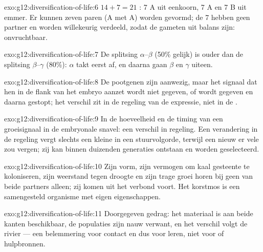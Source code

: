\begin{solution}{exo:g12:diversification-of-life:6}
$14 + 7 = 21$ : 7 A uit eenkoorn, 7 A en 7 B uit emmer. Er
kunnen zeven paren (A met A) worden gevormd; de 7  hebben
geen partner en worden willekeurig verdeeld, zodat de gameten uit balans
zijn: onvruchtbaar.
\end{solution}

\begin{solution}{exo:g12:diversification-of-life:7}
De splitsing $\alpha$--$\beta$ (50\% gelijk) is ouder dan de splitsing
$\beta$--$\gamma$ (80\%): $\alpha$ takt eerst af, en daarna gaan $\beta$
en $\gamma$ uiteen.
\end{solution}

\begin{solution}{exo:g12:diversification-of-life:8}
De pootgenen zijn aanwezig, maar het signaal dat hen in de flank van het
embryo aanzet wordt niet gegeven, of wordt gegeven en daarna gestopt; het
verschil zit in de regeling van de expressie, niet in de .
\end{solution}

\begin{solution}{exo:g12:diversification-of-life:9}
In de hoeveelheid en de timing van een groeisignaal in de embryonale
snavel: een verschil in regeling. Een verandering in de regeling vergt
slechts een kleine  in een stuurvolgorde, terwijl een nieuw 
er vele zou vergen; zij kan binnen duizenden generaties ontstaan en worden
geselecteerd.
\end{solution}

\begin{solution}{exo:g12:diversification-of-life:10}
Zijn vorm, zijn vermogen om kaal gesteente te koloniseren, zijn weerstand
tegen droogte en zijn trage groei horen bij geen van beide partners
alleen; zij komen uit het verbond voort. Het korstmos is een samengesteld
organisme met eigen eigenschappen.
\end{solution}

\begin{solution}{exo:g12:diversification-of-life:11}
Doorgegeven gedrag: het materiaal is aan beide kanten beschikbaar, de
populaties zijn nauw verwant, en het verschil volgt de rivier --- een
belemmering voor contact en dus voor leren, niet voor  of
hulpbronnen.
\end{solution}

